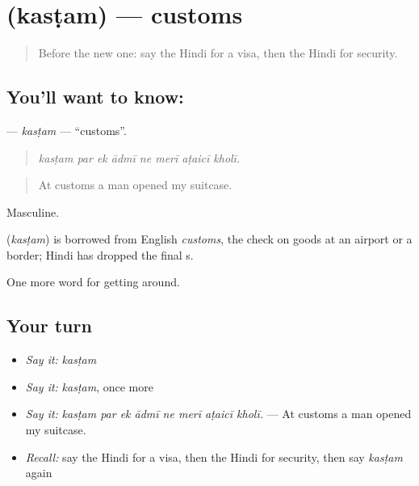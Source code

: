\section[\texorpdfstring{\hi{कस्टम} (kasṭam)}{कस्टम (kasṭam)}]{ (kasṭam) — customs}

\label{lesson:HI-C410-kastam}



\begin{quote}
Before the new one: say the Hindi for a visa, then the Hindi for security.
\end{quote}

\subsection*{You'll want to know: }
\textbf{} — \emph{kasṭam} — \textquotedblleft{}customs\textquotedblright{}.

\begin{quote}
       
\end{quote}

\begin{quote}
\emph{kasṭam par ek ādmī ne merī aṭaicī kholī.}
\end{quote}

\begin{quote}
At customs a man opened my suitcase.
\end{quote}

Masculine.

\begin{cousinweb}
\textbf{} (\emph{kasṭam}) is borrowed from English \emph{customs}, the check on goods at an airport or a border; Hindi has dropped the final s.
\end{cousinweb}

\begin{grammarlens}[title={What you've built}]
One more word for getting around.
\end{grammarlens}

\subsection*{Your turn}
\begin{itemize}
\raggedright
  \item \emph{Say it:} \emph{kasṭam}
  \item \emph{Say it:} \emph{kasṭam}, once more
  \item \emph{Say it:} \emph{kasṭam par ek ādmī ne merī aṭaicī kholī.} — At customs a man opened my suitcase.
  \item \emph{Recall:} say the Hindi for a visa, then the Hindi for security, then say \emph{kasṭam} again
\end{itemize}

